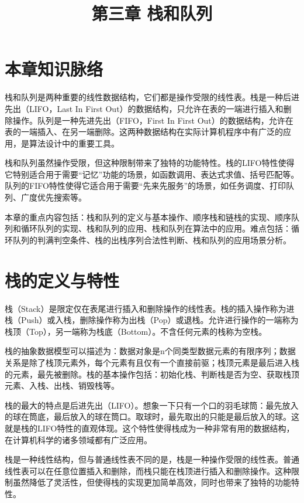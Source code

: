 \documentclass[12pt, a4paper]{article}
\title{\textbf{第三章 栈和队列}}
\author{}
\date{}
\begin{document}
\maketitle

\section*{本章知识脉络}

栈和队列是两种重要的线性数据结构，它们都是操作受限的线性表。栈是一种后进先出（LIFO，Last In First Out）的数据结构，只允许在表的一端进行插入和删除操作。队列是一种先进先出（FIFO，First In First Out）的数据结构，允许在表的一端插入、在另一端删除。这两种数据结构在实际计算机程序中有广泛的应用，是算法设计中的重要工具。

栈和队列虽然操作受限，但这种限制带来了独特的功能特性。栈的LIFO特性使得它特别适合用于需要“记忆”功能的场景，如函数调用、表达式求值、括号匹配等。队列的FIFO特性使得它适合用于需要“先来先服务”的场景，如任务调度、打印队列、广度优先搜索等。

本章的重点内容包括：栈和队列的定义与基本操作、顺序栈和链栈的实现、顺序队列和循环队列的实现、栈和队列的应用、栈和队列在算法中的应用。难点包括：循环队列的判满判空条件、栈的出栈序列合法性判断、栈和队列的应用场景分析。

\section{栈的定义与特性}

栈（Stack）是限定仅在表尾进行插入和删除操作的线性表。栈的插入操作称为进栈（Push）或入栈，删除操作称为出栈（Pop）或退栈。允许进行操作的一端称为栈顶（Top），另一端称为栈底（Bottom）。不含任何元素的栈称为空栈。

栈的抽象数据模型可以描述为：数据对象是n个同类型数据元素的有限序列；数据关系是除了栈顶元素外，每个元素有且仅有一个直接前驱；栈顶元素是最后进入栈的元素，最先被删除。栈的基本操作包括：初始化栈、判断栈是否为空、获取栈顶元素、入栈、出栈、销毁栈等。

栈的最大的特点是后进先出（LIFO）。想象一下只有一个口的羽毛球筒：最先放入的球在筒底，最后放入的球在筒口。取球时，最先取出的只能是最后放入的球。这就是栈的LIFO特性的直观体现。这个特性使得栈成为一种非常有用的数据结构，在计算机科学的诸多领域都有广泛应用。

栈是一种线性结构，但与普通线性表不同的是，栈是一种操作受限的线性表。普通线性表可以在任意位置插入和删除，而栈只能在栈顶进行插入和删除操作。这种限制虽然降低了灵活性，但使得栈的实现更加简单高效，同时也带来了独特的功能特性。
\end{document}
